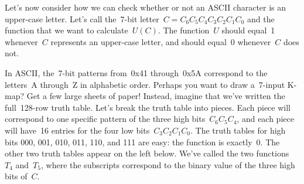 Let's now consider how we can check whether or not an ASCII character is
an upper-case letter.  Let's call the~\mbox{7-bit}
letter~$C=C_6C_5C_4C_3C_2C_1C_0$ and the function that we want to
calculate~$U(C)$.  The function~$U$ should equal~1 whenever~$C$ represents
an upper-case letter, and should equal~0 whenever~$C$ does not.

In ASCII, the~\mbox{7-bit} patterns from~0x41 through~0x5A correspond
to the letters~A through~Z in alphabetic order.  Perhaps you want to draw 
a~\mbox{7-input} \mbox{K-map}?  Get a few large sheets of paper!
%
Instead, imagine that we've written the full~\mbox{128-row} truth
table.  Let's break the truth table into pieces.  Each piece will
correspond to one specific pattern of the three high bits~$C_6C_5C_4$,
and each piece will have~16 entries for the four low bits~$C_3C_2C_1C_0$.
The truth tables for high bits 000, 001, 010, 011, 110, and 111
are easy: the function is exactly~0.  The other two truth tables appear 
on the left below.  We've called the two functions~$T_4$ and~$T_5$, where
the subscripts correspond to the binary value of the three high bits of~$C$.\\

